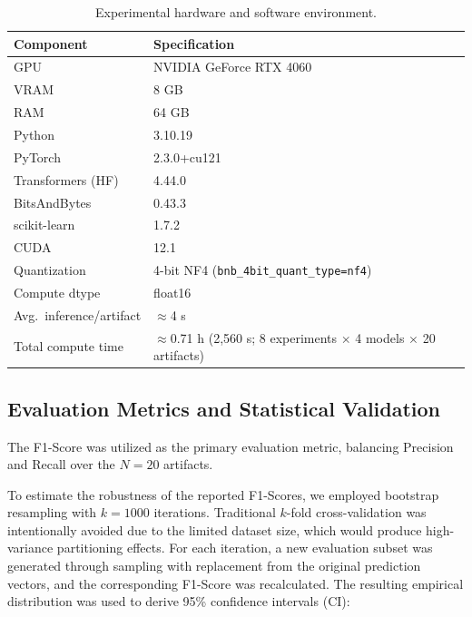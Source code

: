 \documentclass{ieeeaccess}
\begin{document}
\begin{table}[htbp]
\centering
\caption{Experimental hardware and software environment.}
\label{tab:hardware}
\renewcommand{\arraystretch}{1.2}
\begin{tabular}{|l|l|}
\hline
\textbf{Component} & \textbf{Specification} \\
\hline
GPU                     & NVIDIA GeForce RTX 4060 \\
VRAM                    & 8 GB \\
RAM                     & 64 GB \\
Python                  & 3.10.19 \\
PyTorch                 & 2.3.0+cu121 \\
Transformers (HF)       & 4.44.0 \\
BitsAndBytes            & 0.43.3 \\
scikit-learn            & 1.7.2 \\
CUDA                    & 12.1 \\
Quantization            & 4-bit NF4 (\texttt{bnb\_4bit\_quant\_type=nf4}) \\
Compute dtype           & float16 \\
Avg.\ inference/artifact & $\approx$4 s \\
Total compute time      & $\approx$0.71 h (2{,}560 s; 8 experiments $\times$ 4 models $\times$ 20 artifacts) \\
\hline
\end{tabular}
\end{table}

\subsection{Evaluation Metrics and Statistical Validation}
\label{sec:metrics}

The F1-Score was utilized as the primary evaluation metric, balancing Precision and Recall over the $N=20$ artifacts.

To estimate the robustness of the reported F1-Scores, we employed bootstrap resampling with $k=1000$ iterations. Traditional $k$-fold cross-validation was intentionally avoided due to the limited dataset size, which would produce high-variance partitioning effects. For each iteration, a new evaluation subset was generated through sampling with replacement from the original prediction vectors, and the corresponding F1-Score was recalculated. The resulting empirical distribution was used to derive 95\% confidence intervals (CI):
\end{document}
